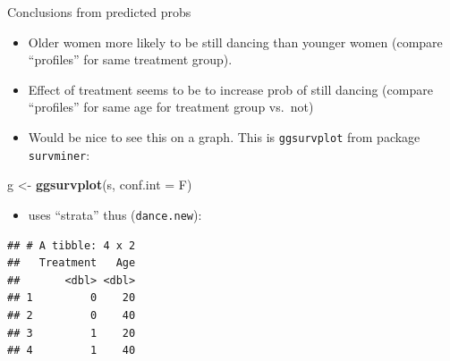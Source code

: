 \documentclass[ignorenonframetext,]{beamer}
\newenvironment{Shaded}{\begin{snugshade}}{\end{snugshade}}
\newcommand{\DataTypeTok}[1]{\textcolor[rgb]{0.13,0.29,0.53}{#1}}
\newcommand{\KeywordTok}[1]{\textcolor[rgb]{0.13,0.29,0.53}{\textbf{#1}}}
\newcommand{\NormalTok}[1]{#1}
\newcommand{\StringTok}[1]{\textcolor[rgb]{0.31,0.60,0.02}{#1}}
\providecommand{\tightlist}{%
  \setlength{\itemsep}{0pt}\setlength{\parskip}{0pt}}
\begin{document}
\begin{frame}[fragile]{Conclusions from predicted probs}
\protect\hypertarget{conclusions-from-predicted-probs}{}

\begin{itemize}
\item
  Older women more likely to be still dancing than younger women
  (compare ``profiles'' for same treatment group).
\item
  Effect of treatment seems to be to increase prob of still dancing
  (compare ``profiles'' for same age for treatment group vs.~not)
\item
  Would be nice to see this on a graph. This is \texttt{ggsurvplot} from
  package \texttt{survminer}:
\end{itemize}

\begin{Shaded}
\begin{Highlighting}[]
\NormalTok{g <-}\StringTok{ }\KeywordTok{ggsurvplot}\NormalTok{(s, }\DataTypeTok{conf.int =}\NormalTok{ F)}
\end{Highlighting}
\end{Shaded}

\begin{itemize}
\tightlist
\item
  uses ``strata'' thus (\texttt{dance.new}):
\end{itemize}

\footnotesize

\begin{verbatim}
## # A tibble: 4 x 2
##   Treatment   Age
##       <dbl> <dbl>
## 1         0    20
## 2         0    40
## 3         1    20
## 4         1    40
\end{verbatim}

\normalsize

\end{frame}
\end{document}
